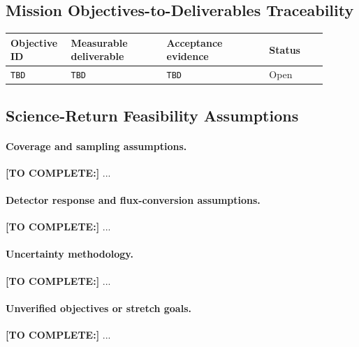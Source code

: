 
\subsection{Mission Objectives-to-Deliverables Traceability}\label{sec:objective-deliverable}
\begin{longtable}{p{0.15\linewidth}p{0.28\linewidth}p{0.30\linewidth}p{0.17\linewidth}}
\toprule
Objective ID & Measurable deliverable & Acceptance evidence & Status \\
\midrule
\endhead
\texttt{TBD} & \texttt{TBD} & \texttt{TBD} & Open \\
\bottomrule
\end{longtable}

\subsection{Science-Return Feasibility Assumptions}\label{sec:science-feasibility-assumptions}
\paragraph{Coverage and sampling assumptions.} \textbf{[TO COMPLETE:]} ...
\paragraph{Detector response and flux-conversion assumptions.} \textbf{[TO COMPLETE:]} ...
\paragraph{Uncertainty methodology.} \textbf{[TO COMPLETE:]} ...
\paragraph{Unverified objectives or stretch goals.} \textbf{[TO COMPLETE:]} ...
